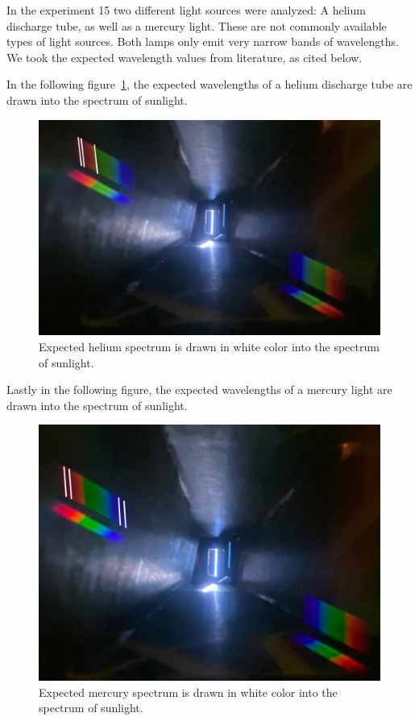 In the experiment 15 two different light sources were analyzed: A helium discharge tube, as well as
a mercury light. These are not commonly available types of light sources. Both lamps only emit very narrow bands
of wavelengths. We took the expected wavelength values from literature, as cited below.

In the following figure~\ref{fig_helium_spectrum}, the expected wavelengths of a helium discharge tube are 
drawn into the spectrum of sunlight. \cite{Helium Discharge Tube}
\begin{figure}[H]
    \centering
    \includegraphics[scale = 0.25]{src/images/helium_spectrum.jpg}
    \caption{Expected helium spectrum is drawn in white color into the spectrum of sunlight.}
    \label{fig_helium_spectrum}
\end{figure}

Lastly in the following figure, the expected wavelengths of a mercury light are drawn into the spectrum of sunlight.
\cite{Mercury Vapor Lamp}
\begin{figure}[H]
    \centering
    \includegraphics[scale = 0.21]{src/images/mercury_spectrum.jpeg}
    \caption{Expected mercury spectrum is drawn in white color into the spectrum of sunlight.}
    \label{fig_mercury_spectrum}
\end{figure}
